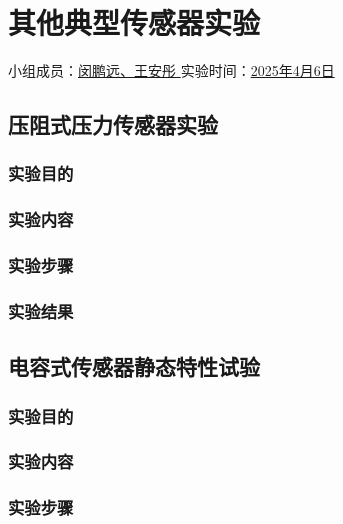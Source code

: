 \section{其他典型传感器实验}

\begin{center}
    {
        小组成员：\underline{\quad 闵鹏远、王安彤 \quad} \quad
        实验时间：\underline{\quad 2025年4月6日 \quad}
    }
\end{center}

\subsection{压阻式压力传感器实验}

\subsubsection{实验目的}

\subsubsection{实验内容}

\subsubsection{实验步骤}

\subsubsection{实验结果}

\subsection{电容式传感器静态特性试验}

\subsubsection{实验目的}

\subsubsection{实验内容}

\subsubsection{实验步骤}

